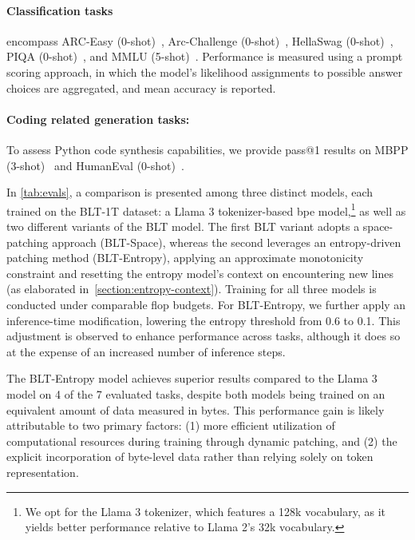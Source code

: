 \paragraph{Classification tasks} encompass ARC-Easy (0-shot)~\citep{Eval_ARC}, Arc-Challenge (0-shot)~\citep{Eval_ARC}, HellaSwag (0-shot)~\citep{Eval_hellaswag}, PIQA (0-shot)~\citep{Eval_piqa}, and MMLU (5-shot)~\citep{hendrycks2020measuring}. Performance is measured using a prompt scoring approach, in which the model's likelihood assignments to possible answer choices are aggregated, and mean accuracy is reported.
\paragraph{Coding related generation tasks:}  To assess Python code synthesis capabilities, we provide pass@1 results on MBPP (3-shot)~\citep{Eval_MBPP} and HumanEval (0-shot)~\citep{Eval_HumanEval}.

In \autoref{tab:evals}, a comparison is presented among three distinct models, each trained on the {\textsc BLT}-1T dataset: a Llama 3 tokenizer-based bpe model,\footnote{We opt for the Llama 3 tokenizer, which features a 128k vocabulary, as it yields better performance relative to Llama 2's 32k vocabulary.} as well as two different variants of the {\textsc BLT} model. The first {\textsc BLT} variant adopts a space-patching approach ({\textsc BLT}-Space), whereas the second leverages an entropy-driven patching method ({\textsc BLT}-Entropy), applying an approximate monotonicity constraint and resetting the entropy model’s context on encountering new lines (as elaborated in~\autoref{section:entropy-context}). Training for all three models is conducted under comparable flop budgets. For {\textsc BLT}-Entropy, we further apply an inference-time modification, lowering the entropy threshold from 0.6 to 0.1. This adjustment is observed to enhance performance across tasks, although it does so at the expense of an increased number of inference steps.

The {\textsc BLT}-Entropy model achieves superior results compared to the Llama 3 model on 4 of the 7 evaluated tasks, despite both models being trained on an equivalent amount of data measured in bytes. This performance gain is likely attributable to two primary factors: (1) more efficient utilization of computational resources during training through dynamic patching, and (2) the explicit incorporation of byte-level data rather than relying solely on token representation.

